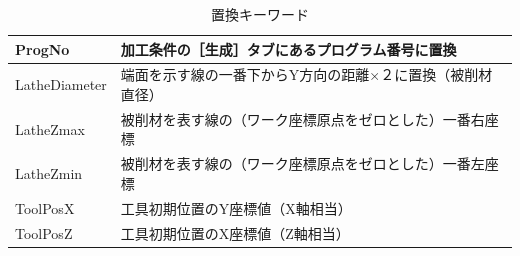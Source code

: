 \begin{table}[H]
\centering
\caption{置換キーワード}
\label{tab:keyword}
\begin{tabular}{|p{3cm}|p{10cm}|}
\hline
ProgNo & 加工条件の［生成］タブにあるプログラム番号に置換 \\ \hline
LatheDiameter & 端面を示す線の一番下からY方向の距離×２に置換（被削材直径）\\ \hline
LatheZmax & 被削材を表す線の（ワーク座標原点をゼロとした）一番右座標 \\ \hline
LatheZmin & 被削材を表す線の（ワーク座標原点をゼロとした）一番左座標 \\ \hline
ToolPosX & 工具初期位置のY座標値（X軸相当）\\ \hline
ToolPosZ & 工具初期位置のX座標値（Z軸相当）\\ \hline
\end{tabular}
\end{table}
